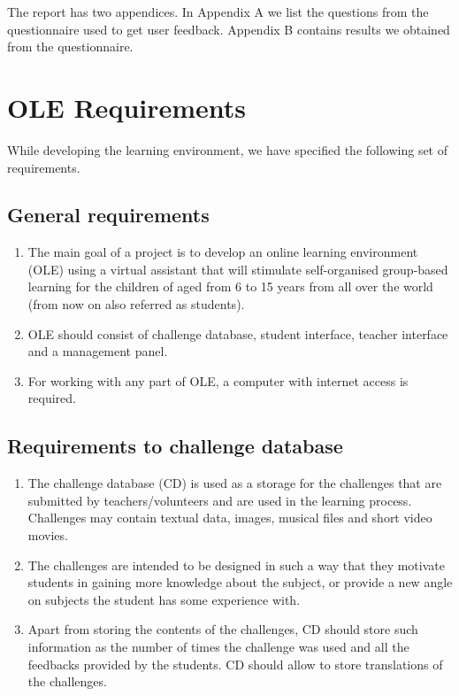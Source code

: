 \documentclass[a4paper]{article}
\begin{document}
The report has two appendices. In Appendix A we list the questions from the questionnaire used to get user feedback. Appendix B contains results we obtained from the questionnaire.

\section{OLE Requirements}

While developing the learning environment, we have specified the following set of requirements.

\subsection{General requirements}

\begin{enumerate}
\item The main goal of a project is to develop an online learning environment (OLE) using a virtual assistant that will stimulate self-organised group-based learning for the children of aged from 6 to 15 years from all over the world (from now on also referred as students).

\item OLE should consist of challenge database, student interface, teacher interface and a management panel.

\item For working with any part of OLE, a computer with internet access is required.
\end{enumerate}

\subsection{Requirements to challenge database}

\begin{enumerate}
\item The challenge database (CD) is used as a storage for the challenges that are submitted by teachers/volunteers and are used in the learning process. Challenges may contain textual data, images, musical files and short video movies.

\item The challenges are intended to be designed in such a way that they motivate students in gaining more knowledge about the subject, or provide a new angle on subjects the student has some experience with.

\item Apart from storing the contents of the challenges, CD should store such information as the number of times the challenge was used and all the feedbacks provided by the students. CD should allow to store translations of the challenges.
\end{enumerate}
\end{document}

